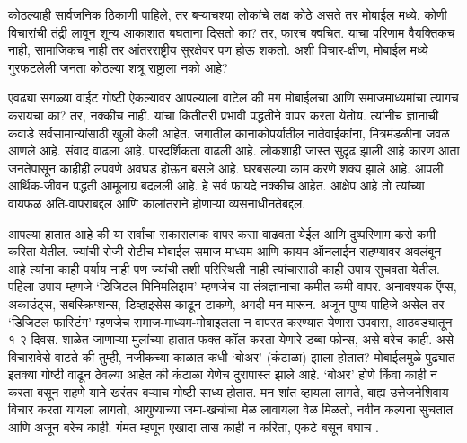 कोठल्याही सार्वजनिक ठिकाणी पाहिले, तर बऱ्याचश्या लोकांचे लक्ष कोठे असते तर मोबाईल मध्ये. कोणी विचारांची तंद्री लावून शून्य आकाशात बघताना दिसतो का? तर, फारच क्वचित. याचा परिणाम वैयक्तिकच नाही, सामाजिकच नाही तर आंतरराष्ट्रीय सुरक्षेवर पण होऊ शकतो. अशी विचार-क्षीण, मोबाईल मध्ये गुरफटलेली जनता कोठल्या शत्रू राष्ट्राला नको आहे?

एवढ्या सगळ्या वाईट गोष्टी ऐकल्यावर आपल्याला वाटेल की मग मोबाईलचा आणि समाजमाध्यमांचा त्यागच करायचा का? तर, नक्कीच नाही. यांचा कितीतरी प्रभावी पद्धतीने वापर करता येतोय. त्यांनीच ज्ञानाची कवाडे सर्वसामान्यांसाठी खुली केली आहेत. जगातील कानाकोपर्यातील नातेवाईकांना, मित्रमंडळीना जवळ आणले आहे. संवाद वाढला आहे. पारदर्शिकता वाढली आहे. लोकशाही जास्त सुदृढ झाली आहे कारण आता जनतेपासून काहीही लपवणे अवघड होऊन बसले आहे. घरबसल्या काम करणे शक्य झाले आहे. आपली आर्थिक-जीवन पद्धती आमूलाग्र बदलली आहे. हे सर्व फायदे नक्कीच आहेत. आक्षेप आहे तो त्यांच्या वायफळ अति-वापराबद्दल आणि कालांतराने होणाऱ्या व्यसनाधीनतेबद्दल.

आपल्या हातात आहे की या सर्वांचा सकारात्मक वापर कसा वाढवता येईल आणि दुष्परिणाम कसे कमी करिता येतील. ज्यांची रोजी-रोटीच मोबाईल-समाज-माध्यम आणि कायम ऑनलाईन राहण्यावर अवलंबून आहे त्यांना काही पर्याय नाही पण ज्यांची तशी परिस्थिती नाही त्यांचासाठी काही उपाय सुचवता येतील. पहिला उपाय म्हणजे ‘डिजिटल मिनिमलिझम’ म्हणजेच या तंत्रज्ञानाचा कमीत कमी वापर. अनावश्यक ऍप्स, अकाउंट्स, सबस्क्रिप्शन्स, डिव्हाइसेस काढून टाकणे, अगदी मन मारून. अजून पुण्य पाहिजे असेल तर ‘डिजिटल फास्टिंग’ म्हणजेच समाज-माध्यम-मोबाइलला न वापरत करण्यात येणारा उपवास, आठवड्यातून १-२ दिवस. शाळेत जाणाऱ्या मुलांच्या हातात फक्त कॉल करता येणारे डब्बा-फोन्स, असे बरेच काही. असे विचारावेसे वाटते की तुम्ही, नजीकच्या काळात कधी ‘बोअर’ (कंटाळा) झाला होतात? मोबाईलमुळे पुढ्यात इतक्या गोष्टी वाढून ठेवल्या आहेत की कंटाळा येणेच दुरापास्त झाले आहे. ‘बोअर’ होणे किंवा काही न करता बसून राहणे याने खरंतर बऱ्याच गोष्टी साध्य होतात. मन शांत व्हायला लागते, बाह्य-उत्तेजनेशिवाय विचार करता यायला लागतो, आयुष्याच्या जमा-खर्चाचा मेळ लावायला वेळ मिळतो, नवीन कल्पना सुचतात आणि अजून बरेच काही. गंमत म्हणून एखादा तास काही न करिता, एकटे बसून बघाच .
